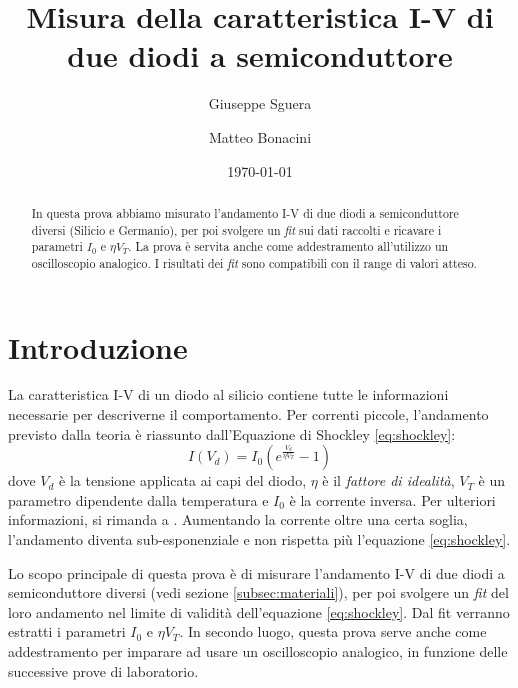 \documentclass[11pt, a4paper, twoside]{article}
\author{Giuseppe Sguera \\ \getenv{MAT1} \and Matteo Bonacini \\ \getenv{MAT2}}
\date{\today}
\title{Misura della caratteristica I-V di due diodi a semiconduttore}
\begin{document}

    \maketitle

    \begin{abstract}\label{sec:abstract}
      In questa prova abbiamo misurato l'andamento I-V di due diodi a semiconduttore diversi (Silicio e Germanio), per poi svolgere un \emph{fit}
      sui dati raccolti e ricavare i parametri $I_0$ e $\eta V_T$. La prova è servita anche come addestramento all'utilizzo
      un oscilloscopio analogico. I risultati dei \emph{fit} sono compatibili con il range di valori atteso.
    \end{abstract}

\section{Introduzione}\label{sec:scopo}
  La caratteristica I-V di un diodo al silicio contiene tutte le informazioni necessarie per descriverne il comportamento.
  Per correnti piccole, l'andamento previsto dalla teoria è riassunto dall'Equazione di Shockley \eqref{eq:shockley}:
  \begin{equation}
    I(V_d) = I_0 \left(
      e^{
        \frac {V_d} {\eta V_T}
      } - 1
    \right)
    \label{eq:shockley}
  \end{equation}
  dove $V_d$ è la tensione applicata ai capi del diodo, $\eta$ è il \emph{fattore di idealità}, $V_T$ è un parametro dipendente dalla
  temperatura e $I_0$ è la corrente inversa. Per ulteriori informazioni, si rimanda a \cite{halkias2001integrated}.
  Aumentando la corrente oltre una certa soglia, l'andamento diventa sub-esponenziale e non rispetta più l'equazione \eqref{eq:shockley}.

  Lo scopo principale di questa prova è di misurare l'andamento I-V di due diodi a semiconduttore diversi (vedi sezione \ref{subsec:materiali}), per poi svolgere un
  \emph{fit} del loro andamento nel limite di validità dell'equazione \eqref{eq:shockley}. Dal fit verranno estratti i parametri $I_0$ e $\eta V_T$.
  In secondo luogo, questa prova serve anche come addestramento per imparare ad usare un oscilloscopio analogico, in funzione delle successive
  prove di laboratorio.
\end{document}
